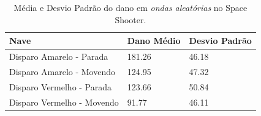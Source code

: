\begin{table}
\begin{tabular}{l|ll}
Nave                        & Dano Médio & Desvio Padrão \\ \hline
Disparo Amarelo - Parada    & 181.26     & 46.18         \\
Disparo Amarelo - Movendo   & 124.95     & 47.32         \\
Disparo Vermelho - Parada   & 123.66     & 50.84         \\
Disparo Vermelho - Movendo  & 91.77      & 46.11          
\end{tabular}
\caption{Média e Desvio Padrão do dano em \textit{ondas aleatórias} no Space Shooter.}
\label{tab:ss-rd-avg}
\end{table}




